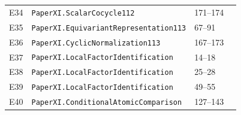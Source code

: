 \documentclass[10pt,oneside]{book}
\begin{document}
\begin{longtable}{@{}p{}p{}p{}p{}@{}}
E34&\nolinkurl{PaperXI.ScalarCocycle112}&171--174&\pageref{guide:E34}\\

E35&\nolinkurl{PaperXI.EquivariantRepresentation113}&67--91&\pageref{guide:E35}\\

E36&\nolinkurl{PaperXI.CyclicNormalization113}&167--173&\pageref{guide:E36}\\

E37&\nolinkurl{PaperXI.LocalFactorIdentification}&14--18&\pageref{guide:E37}\\

E38&\nolinkurl{PaperXI.LocalFactorIdentification}&25--28&\pageref{guide:E38}\\

E39&\nolinkurl{PaperXI.LocalFactorIdentification}&49--55&\pageref{guide:E39}\\

E40&\nolinkurl{PaperXI.ConditionalAtomicComparison}&127--143&\pageref{guide:E40}\\

\bottomrule\end{longtable}
\end{document}
